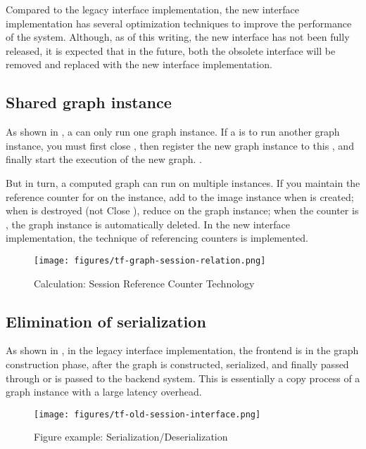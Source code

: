 \begin{content}
Compared to the legacy interface implementation, the new interface implementation has several optimization techniques to improve the performance of the system. Although, as of this writing, the new interface has not been fully released, it is expected that in the future, both the obsolete interface will be removed and replaced with the new interface implementation.


\subsection{Shared graph instance}
As shown in , a  can only run one graph instance. If a  is to run another graph instance, you must first close , then register the new graph instance to this , and finally start the execution of the new graph. .

But in turn, a computed graph can run on multiple  instances. If you maintain the reference counter for  on the  instance, add  to the image instance when  is created; when  is destroyed (not Close ), reduce  on the graph instance; when the counter is , the graph instance is automatically deleted. In the new interface implementation, the technique of referencing counters is implemented.

\begin{figure}[H]
  \centering
  \texttt{[image: figures/tf-graph-session-relation.png]}
  \caption{Calculation: Session Reference Counter Technology}
  \label{fig:tf-graph-session-relation}
\end{figure}


\subsection{Elimination of serialization}
As shown in , in the legacy interface implementation, the frontend  is in the graph construction phase, after the graph is constructed, serialized, and finally passed through  or  is passed to the backend  system. This is essentially a copy process of a graph instance with a large latency overhead.

\begin{figure}[H]
  \centering
  \texttt{[image: figures/tf-old-session-interface.png]}
  \caption{Figure example: Serialization/Deserialization}
  \label{fig:tf-old-session-interface}
\end{figure}


\end{content}
